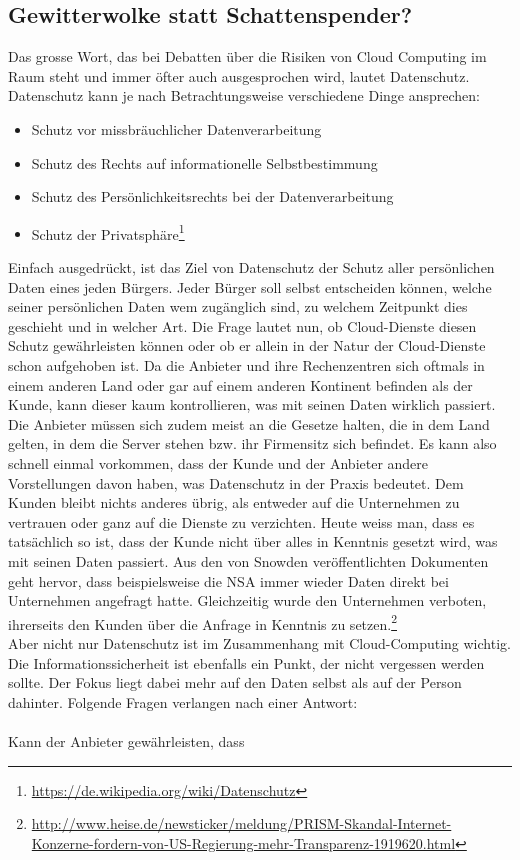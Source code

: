 \subsection{Gewitterwolke statt Schattenspender?}
Das grosse Wort, das bei Debatten über die Risiken von Cloud Computing im Raum steht und immer öfter auch ausgesprochen wird, lautet Datenschutz. Datenschutz kann je nach Betrachtungsweise verschiedene Dinge ansprechen:

\begin{itemize}
\item Schutz vor missbräuchlicher Datenverarbeitung
\item Schutz des Rechts auf informationelle Selbstbestimmung
\item Schutz des Persönlichkeitsrechts bei der Datenverarbeitung
\item Schutz der Privatsphäre\footnote{\url{https://de.wikipedia.org/wiki/Datenschutz}}
\end{itemize}

Einfach ausgedrückt, ist das Ziel von Datenschutz der Schutz aller persönlichen Daten eines jeden Bürgers. Jeder Bürger soll selbst entscheiden können, welche seiner persönlichen Daten wem zugänglich sind, zu welchem Zeitpunkt dies geschieht und in welcher Art. Die Frage lautet nun, ob Cloud-Dienste diesen Schutz gewährleisten können oder ob er allein in der Natur der Cloud-Dienste schon aufgehoben ist. Da die Anbieter und ihre Rechenzentren sich oftmals in einem anderen Land oder gar auf einem anderen Kontinent befinden als der Kunde, kann dieser kaum kontrollieren, was mit seinen Daten wirklich passiert. Die Anbieter müssen sich zudem meist an die Gesetze halten, die in dem Land gelten, in dem die Server stehen bzw. ihr Firmensitz sich befindet. Es kann also schnell einmal vorkommen, dass der Kunde und der Anbieter  andere Vorstellungen davon haben, was Datenschutz in der Praxis bedeutet. Dem Kunden bleibt nichts anderes übrig, als entweder auf die Unternehmen zu vertrauen oder ganz auf die Dienste zu verzichten. Heute weiss man, dass es tatsächlich so ist, dass der Kunde nicht über alles in Kenntnis gesetzt wird, was mit seinen Daten passiert. Aus den von Snowden veröffentlichten Dokumenten geht hervor, dass beispielsweise die NSA  immer wieder Daten direkt bei Unternehmen angefragt hatte. Gleichzeitig wurde den Unternehmen verboten, ihrerseits den Kunden über die Anfrage in Kenntnis zu setzen.\footnote{\url{http://www.heise.de/newsticker/meldung/PRISM-Skandal-Internet-Konzerne-fordern-von-US-Regierung-mehr-Transparenz-1919620.html}}
\\
Aber nicht nur Datenschutz ist im Zusammenhang mit Cloud-Computing wichtig. Die Informationssicherheit ist ebenfalls ein Punkt, der nicht vergessen werden sollte. Der Fokus liegt dabei mehr auf den Daten selbst als auf der Person dahinter. Folgende Fragen verlangen nach einer Antwort:
\\
\\
Kann der Anbieter gewährleisten, dass


